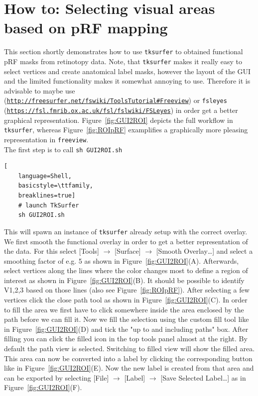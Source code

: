 \documentclass[12pt,a4paper]{scrartcl}
\begin{document}
\section{How to: Selecting visual areas based on pRF mapping}
\label{sec:GUIprf}
This section shortly demonstrates how to use \texttt{tksurfer} to obtained functional pRF masks from retinotopy data. Note, that \texttt{tksurfer} makes it
really easy to select vertices and create anatomical label masks, however the
layout of the GUI and the limited functionality makes it somewhat annoying to use. Therefore it is advisable to maybe use  (\href{http://freesurfer.net/fswiki/ToolsTutorial#Freeview}{\nolinkurl{http://freesurfer.net/fswiki/ToolsTutorial#Freeview}}) or \texttt{fsleyes} (\href{https://fsl.fmrib.ox.ac.uk/fsl/fslwiki/FSLeyes}{\nolinkurl{https://fsl.fmrib.ox.ac.uk/fsl/fslwiki/FSLeyes}}) in order get a better graphical representation. Figure~\ref{fig:GUI2ROI} depicts the full workflow in \texttt{tksurfer}, whereas Figure~\ref{fig:ROIpRF} examplifies a graphically more pleasing representation in \texttt{freeview}.\\

\noindent The first step is to call \texttt{sh GUI2ROI.sh}
\begin{lstlisting}[
    language=Shell,
    basicstyle=\ttfamily,
    breaklines=true]
    # launch TkSurfer
    sh GUI2ROI.sh
\end{lstlisting}
This will spawn an instance of \texttt{tksurfer} already setup with the correct overlay.\\
\noindent We first smooth the functional overlay in order to get a better representation of the data. For this select [Tools] $\rightarrow$ [Surface] $\rightarrow$ [Smooth Overlay\dots] and select a smoothing factor of e.g. 5 as shown in Figure~\ref{fig:GUI2ROI}(A). Afterwards, select vertices along the lines where the color changes most to define a region of interest as shown in Figure~\ref{fig:GUI2ROI}(B). It should be possible to identify V1,2,3 based on those lines (also see Figure~\ref{fig:ROIpRF}). After selecting a few vertices click the close path tool as shown in Figure~\ref{fig:GUI2ROI}(C). In order to fill the area we first have to click somewhere inside the area enclosed by the path before we can fill it. Now we fill the selection using the custom fill tool like in Figure~\ref{fig:GUI2ROI}(D) and tick the "up to and including paths" box. After filling you can click the filled icon in the top tools panel almost at the right. By default the path view is selected. Switching to filled view will show the filled area. This area can now be converted into a label by clicking the corresponding button like in Figure~\ref{fig:GUI2ROI}(E). Now the new label is created from that area and can be exported by selecting [File] $\rightarrow$ [Label] $\rightarrow$ [Save Selected Label\dots] as in Figure~\ref{fig:GUI2ROI}(F).\\
\end{document}
